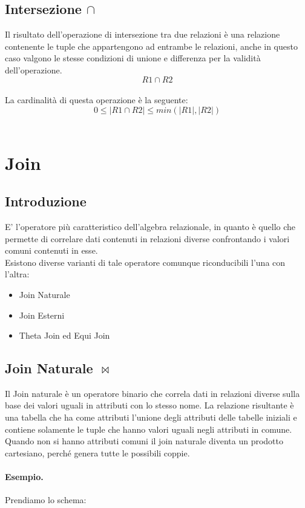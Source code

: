 \documentclass{report}
\begin{document}
\subsection{Intersezione $\cap$}
Il risultato dell'operazione di intersezione tra due relazioni è una relazione contenente le tuple che appartengono ad entrambe le relazioni, anche in questo caso valgono le stesse condizioni di unione e differenza per la validità dell'operazione.\\
$$R1 \cap R2$$\\
La cardinalità di questa operazione è la seguente:\\
$$ 0 \leq |R1 \cap R2| \leq min(|R1|, |R2|)$$\\

\section{Join}
\subsection{Introduzione}
E’ l’operatore più caratteristico dell’algebra relazionale, in quanto è quello che permette di correlare dati contenuti in relazioni diverse confrontando i valori comuni contenuti in esse.\\
Esistono diverse varianti di tale operatore comunque riconducibili l’una con l’altra:
\begin{itemize} 
    \item Join Naturale
    \item Join Esterni
    \item Theta Join ed Equi Join\\
\end{itemize}
\subsection{Join Naturale $\bowtie$}
Il Join naturale è un operatore binario che correla dati in relazioni diverse sulla base dei valori uguali in attributi con lo stesso nome. La relazione risultante è una tabella che ha come attributi l’unione degli attributi delle tabelle iniziali e contiene solamente le tuple che hanno valori uguali negli attributi in comune.\\
Quando non si hanno attributi comuni il join naturale diventa un prodotto cartesiano, perch\'e genera tutte le possibili coppie. 

\paragraph{Esempio.}  Prendiamo lo schema: \\
\end{document}
